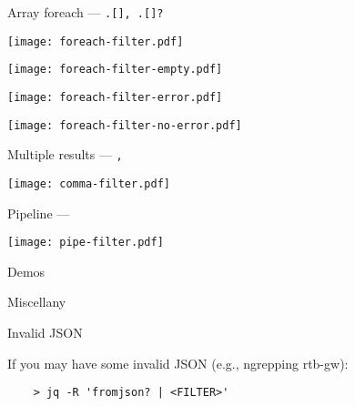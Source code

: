 \documentclass{beamer}
\renewcommand\big[1]{
  \begin{center}
    \Large{#1}
  \end{center}
}
\begin{document}
\begin{frame}[fragile]
  \big{Array foreach --- \texttt{.[], .[]?}}
  \begin{center}
    \begin{minipage}{.34\textwidth}
      \texttt{[image: foreach-filter.pdf]}
    \end{minipage}
    \begin{minipage}{.2\textwidth}
      \texttt{[image: foreach-filter-empty.pdf]}
    \end{minipage}
    \begin{minipage}{.2\textwidth}
      \texttt{[image: foreach-filter-error.pdf]}
    \end{minipage}
    \begin{minipage}{.2\textwidth}
      \texttt{[image: foreach-filter-no-error.pdf]}
    \end{minipage}
  \end{center}
\end{frame}


\begin{frame}[fragile]
  \big{Multiple results --- \texttt{,}}
  \begin{center}
    \texttt{[image: comma-filter.pdf]}
  \end{center}
\end{frame}

\begin{frame}[fragile]
  \big{Pipeline --- \texttt{\textpipe}}
  \begin{center}
    \texttt{[image: pipe-filter.pdf]}
  \end{center}
\end{frame}

\begin{frame}
  \centering\Huge{Demos}
\end{frame}

\begin{frame}
  \centering\Huge{Miscellany}
\end{frame}

\begin{frame}[fragile]
  \big{Invalid JSON}

  If you may have some invalid JSON (e.g., ngrepping rtb-gw):

  \begin{lstlisting}
    > jq -R 'fromjson? | <FILTER>'
  \end{lstlisting}
\end{frame}
\end{document}
